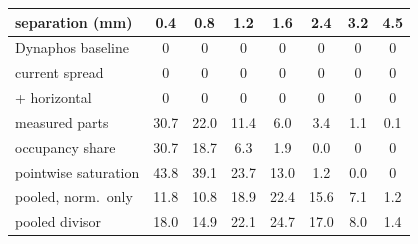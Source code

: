 \begin{tabular}{lccccccc}
\toprule
separation (mm) & 0.4 & 0.8 & 1.2 & 1.6 & 2.4 & 3.2 & 4.5 \\
\midrule
Dynaphos baseline & 0 & 0 & 0 & 0 & 0 & 0 & 0 \\
current spread & 0 & 0 & 0 & 0 & 0 & 0 & 0 \\
\quad + horizontal & 0 & 0 & 0 & 0 & 0 & 0 & 0 \\
\midrule
measured parts & 30.7 & 22.0 & 11.4 & 6.0 & 3.4 & 1.1 & 0.1 \\
\quad occupancy share & 30.7 & 18.7 & 6.3 & 1.9 & 0.0 & 0 & 0 \\
\midrule
pointwise saturation & 43.8 & 39.1 & 23.7 & 13.0 & 1.2 & 0.0 & 0 \\
pooled, norm.\ only & 11.8 & 10.8 & 18.9 & 22.4 & 15.6 & 7.1 & 1.2 \\
pooled divisor & 18.0 & 14.9 & 22.1 & 24.7 & 17.0 & 8.0 & 1.4 \\
\bottomrule
\end{tabular}

